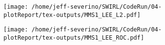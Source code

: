 \begin{figure}[h!]
    \centering
    \texttt{[image: /home/jeff-severino/SWIRL/CodeRun/04-plotReport/tex-outputs/MMS1\_LEE\_L2.pdf]}
    \label{fig:9}
\end{figure}

\begin{figure}[h!]
    \centering
    \texttt{[image: /home/jeff-severino/SWIRL/CodeRun/04-plotReport/tex-outputs/MMS1\_LEE\_ROC.pdf]}
    \label{fig:9}
\end{figure}








